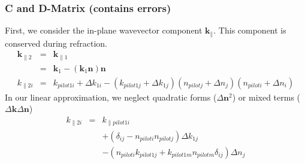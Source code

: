\documentclass[12pt,a4paper,twoside,openright,BCOR10mm,headsepline,titlepage,abstracton,chapterprefix,final]{scrreprt}
\newcommand\Vector[1]{{\mathbf{#1}}}
\newcommand\wavenumber{k}
\newcommand\Wavevector{\Vector{\wavenumber}}
\begin{document}
\subsubsection{C and D-Matrix (contains errors)}
First, we consider the in-plane wavevector component $\Wavevector_\parallel$.
This component is conserved during refraction.
\begin{eqnarray}
 \Wavevector_{\parallel2} 
 &=& \Wavevector_{\parallel1} \\
 &=& \Wavevector_1 - (\Wavevector_1 \Vector{n}) \Vector{n} \\
 \wavenumber_{\parallel2i}
 &=& \wavenumber_{pilot1i} + \Delta \wavenumber_{1i} - ( \wavenumber_{pilot1j} + \Delta \wavenumber_{1j} )( n_{pilotj} + \Delta n_j )( n_{piloti} + \Delta n_i )
\end{eqnarray}
In our linear approximation, we neglect quadratic forms ($\Delta \Vector{n}^2$) or mixed terms ($\Delta \Wavevector \Delta \Vector{n}$)
\begin{eqnarray}
 \wavenumber_{\parallel2i}
 &=& 
 \wavenumber_{\parallel pilot1i} \nonumber\\
 &&+ ( \delta_{ij} -  n_{piloti} n_{pilotj} ) \Delta \wavenumber_{1j} \nonumber\\
 &&- ( n_{piloti} \wavenumber_{pilot1j} + \wavenumber_{pilot1m}   n_{pilotm} \delta_{ij}) \Delta n_j
\end{eqnarray}
\end{document}
